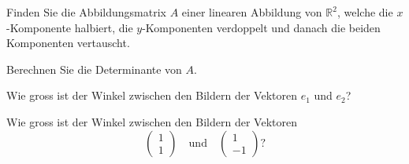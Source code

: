 Finden Sie die Abbildungsmatrix $A$ einer linearen Abbildung von $\mathbb R^2$,
welche die $x$-Komponente halbiert, die $y$-Komponenten verdoppelt und
danach die beiden Komponenten vertauscht.
\begin{teilaufgaben}
\item Berechnen Sie die Determinante von $A$.
\item Wie gross ist der Winkel zwischen den Bildern der Vektoren
$e_1$ und $e_2$?
\item Wie gross ist der Winkel zwischen den Bildern der Vektoren
\[
\begin{pmatrix}1\\1\end{pmatrix}\quad\text{und}\quad
\begin{pmatrix}1\\-1\end{pmatrix}?
\]
\end{teilaufgaben}


